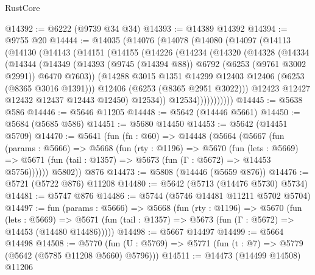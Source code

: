 \begin{lexlean}{RustCore}
\begin{coremodule}
@14392 := @6222 (@9739 @34 @34)
@14393 := @14389 @14392
@14394 := @9755 @20
@14444 := @14035
    (@14076
      (@14078
        (@14080
          (@14097
            (@14113
              (@14130
                (@14143
                  (@14151
                    (@14155
                      (@14226
                        (@14234
                          (@14320
                            (@14328
                              (@14334
                                (@14344
                                  (@14349
                                    (@14393
                                      (@9745 (@14394 @88))
                                      @6792
                                      (@6253 (@9761 @3002 @2991))
                                      @6470
                                      @7603))
                                  (@14288
                                    @3015
                                    @1351
                                    @14299
                                    @12403
                                    @12406
                                    (@6253 (@8365 @3016 @1391)))
                                  @12406
                                  (@6253 (@8365 @2951 @3022)))
                                @12423
                                @12427
                                @12432
                                @12437
                                @12443
                                @12450)
                              @12534))
                          @12534)))))))))))
@14445 := @5638 @586
@14446 := @5646 @11205
@14448 := @5642 (@14446 @5661)
@14450 := @5684 (@5685 @586)
@14451 := @5680 @14450
@14453 := @5642 (@14451 @5709)
@14470 := @5641
    (fun (fn : @60) =>
    @14448
      (@5664
        (@5667
          (fun (params : @5666) =>
          @5668
            (fun (rty : @1196) =>
            @5670
              (fun (lets : @5669) =>
              @5671 (fun (tail : @1357) => @5673 (fun (Γ : @5672) => @14453 @5756))))))
        @5802))
    @876
@14473 := @5808 (@14446 (@5659 @876))
@14476 := @5721 (@5722 @876) @11208
@14480 := @5642 (@5713 (@14476 @5730) @5734)
@14481 := @5747 @876
@14486 := @5744 (@5746 @14481 @11211 @5702 @5704)
@14497 := fun (params : @5666) =>
  @5668
    (fun (rty : @1196) =>
    @5670
      (fun (lets : @5669) =>
      @5671 (fun (tail : @1357) => @5673 (fun (Γ : @5672) => @14453 (@14480 @14486)))))
@14498 := @5667 @14497
@14499 := @5664 @14498
@14508 := @5770
    (fun (U : @5769) => @5771 (fun (t : @7) => @5779 (@5642 (@5785 @11208 @5660) @5796)))
@14511 := @14473 (@14499 @14508) @11206

\end{coremodule}
\end{lexlean}
